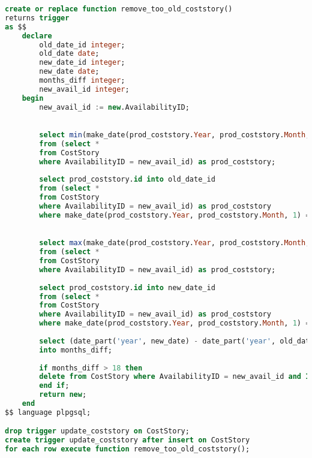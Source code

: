 \documentclass{bmstu}
\begin{document}
\begin{lstlisting}[language=sql, caption={Реализация триггера для обновления истории цен}]
create or replace function remove_too_old_coststory()
returns trigger
as $$
	declare
		old_date_id integer;
		old_date date;
		new_date_id integer;
		new_date date;
		months_diff integer;
		new_avail_id integer;
	begin
		new_avail_id := new.AvailabilityID;
		

		select min(make_date(prod_coststory.Year, prod_coststory.Month, 1)) into old_date
		from (select * 
		from CostStory 
		where AvailabilityID = new_avail_id) as prod_coststory;
		
		select prod_coststory.id into old_date_id
		from (select * 
		from CostStory 
		where AvailabilityID = new_avail_id) as prod_coststory
		where make_date(prod_coststory.Year, prod_coststory.Month, 1) = old_date;
		

		select max(make_date(prod_coststory.Year, prod_coststory.Month, 1)) into new_date
		from (select * 
		from CostStory 
		where AvailabilityID = new_avail_id) as prod_coststory;
		
		select prod_coststory.id into new_date_id
		from (select * 
		from CostStory 
		where AvailabilityID = new_avail_id) as prod_coststory
		where make_date(prod_coststory.Year, prod_coststory.Month, 1) = new_date;
		
		select (date_part('year', new_date) - date_part('year', old_date)) * 12 + (date_part('month', new_date) - date_part('month', old_date)) + 1
		into months_diff;
		
		if months_diff > 18 then
		delete from CostStory where AvailabilityID = new_avail_id and ID = old_date_id;
		end if;
		return new;
	end
$$ language plpgsql;

drop trigger update_coststory on CostStory;
create trigger update_coststory after insert on CostStory
for each row execute function remove_too_old_coststory();
\end{lstlisting}
\end{document}
